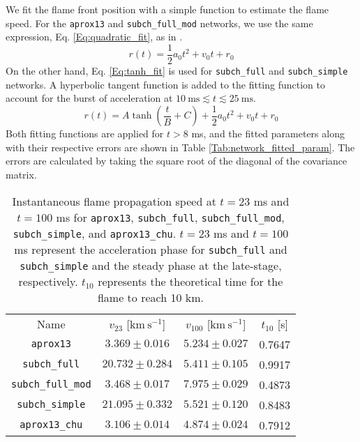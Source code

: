 \documentclass[preprint,times,tighten,linenumbers]{aastex631}
\begin{document}
We fit the flame front position with a simple function to estimate
the flame speed.  For the {\tt aprox13} and {\tt subch\_full\_mod} networks, we use the same expression, Eq. \ref{Eq:quadratic_fit}, 
as in \citet{harpole:2021}.
\begin{equation}\label{Eq:quadratic_fit}
    r(t) = \frac{1}{2}a_0 t^2 + v_0 t + r_0
\end{equation}
On the other hand, Eq. \ref{Eq:tanh_fit} is used for {\tt subch\_full} and {\tt subch\_simple} networks. A hyperbolic tangent function is added to the fitting function to account for the burst of acceleration at $10 \ \mbox{ms} \lesssim t \lesssim 25 \ \mbox{ms}$.
\begin{equation}\label{Eq:tanh_fit}
    r(t) = A\tanh{\left(\frac{t}{B} + C\right)} + \frac{1}{2}a_0 t^2 + v_0 t + r_0
\end{equation}
Both fitting functions are applied for $t > 8$ ms, and the fitted parameters along with their respective errors are shown in Table \ref{Tab:network_fitted_param}. The errors are calculated by taking the square root of the diagonal of the covariance matrix. 


\begin{table*}
\caption{\label{Tab:network_instan_vel}
Instantaneous flame propagation speed at $t = 23$ ms and $t = 100$ ms for {\tt aprox13}, {\tt subch\_full}, {\tt subch\_full\_mod}, {\tt subch\_simple}, and {\tt aprox13\_chu}. $t = 23$ ms and $t=100$ ms represent the acceleration phase for {\tt subch\_full} and {\tt subch\_simple} and the steady phase at the late-stage, respectively. $t_{10}$ represents the theoretical time for the flame to reach 10 km.
}

\begin{ruledtabular}
\footnotesize
\centering
\begin{tabular}{cccc}
\small 
Name &
$v_{23}$ [$\mbox{km} \ \mbox{s}^{-1}$] &
$v_{100}$ [$\mbox{km} \ \mbox{s}^{-1}$] &
$t_{10}$ [s]
\\
\colrule

{\tt aprox13} & $3.369 \pm 0.016$ & $5.234 \pm 0.027$ & 0.7647 \\
{\tt subch\_full} & $20.732 \pm 0.284$ & $5.411 \pm 0.105$ & 0.9917 \\
{\tt subch\_full\_mod} & $3.468 \pm 0.017$ & $7.975 \pm 0.029$ & 0.4873 \\
{\tt subch\_simple} & $21.095 \pm 0.332$ & $5.521 \pm 0.120$ & 0.8483 \\
{\tt aprox13\_chu} & $3.106 \pm 0.014$ & $4.874 \pm 0.024$ & 0.7912 \\
\end{tabular}
\end{ruledtabular}
\end{table*}
\end{document}
